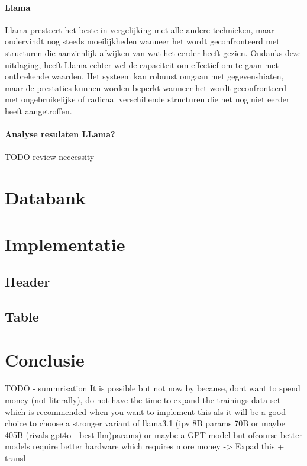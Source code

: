 \paragraph{Llama}
Llama presteert het beste in vergelijking met alle andere technieken, maar ondervindt nog steeds moeilijkheden wanneer het wordt geconfronteerd met structuren die aanzienlijk afwijken van wat het eerder heeft gezien. Ondanks deze uitdaging, heeft Llama echter wel de capaciteit om effectief om te gaan met ontbrekende waarden. Het systeem kan robuust omgaan met gegevenshiaten, maar de prestaties kunnen worden beperkt wanneer het wordt geconfronteerd met ongebruikelijke of radicaal verschillende structuren die het nog niet eerder heeft aangetroffen.
\paragraph{Analyse resulaten LLama?}
TODO review neccessity


\section{Databank}
\section{Implementatie}
\subsection{Header}
\subsection{Table}



\section{Conclusie}
TODO - 
summrisation
It is possible but not now by because, dont want to spend money (not literally), do not have the time to expand the trainings data set which is recommended when you want to implement this als it will be a good choice to choose a stronger variant of llama3.1 (ipv 8B params 70B or maybe 405B (rivals gpt4o - best llm)params) or maybe a GPT model but ofcourse better models require better hardware which requires more money
-> Expad this + transl